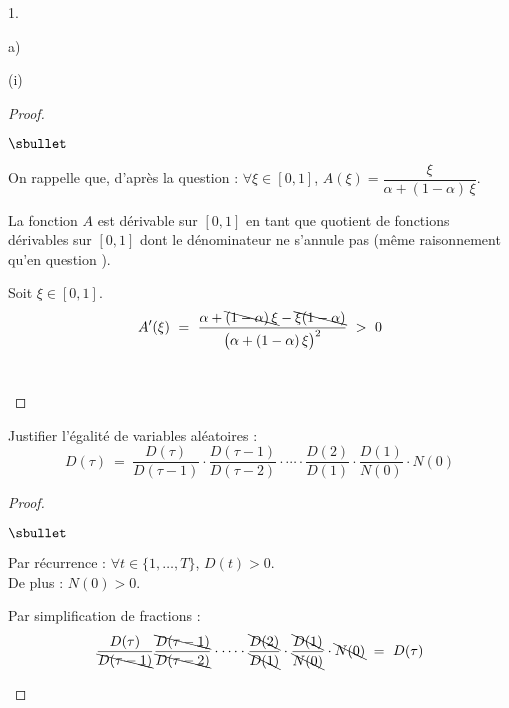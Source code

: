 \documentclass[11pt]{article}%
\begin{document}
\begin{noliste}{1.}
\begin{noliste}{a)}
\begin{nonoliste}{(i)}
      \begin{proof}~
        \begin{noliste}{$\sbullet$}
	  \item On rappelle que, d'après la question  :
	  $\forall \xi \in [0,1]$, $A(\xi) = \dfrac{\xi}{\alpha +
	  (1-\alpha) \, \xi}$.
	  
	  \item La fonction $A$ est dérivable sur $[0,1]$ en tant que 
	  quotient de fonctions dérivables sur $[0,1]$ dont le 
	  dénominateur ne s'annule pas (même raisonnement qu'en question 
	  ).
	  
	  \item Soit $\xi \in [0,1]$.
	  \[
	    A'(\xi) \ = \ \dfrac{\alpha + \bcancel{(1-\alpha) \, \xi}
	    - \bcancel{\xi(1-\alpha)}}{\big(\alpha + (1-\alpha) \,
	    \xi \big)^2} \ > \ 0
	  \]
	  ~\\[-1.4cm]
        \end{noliste}
      \end{proof}
    \end{nonoliste}
  \end{noliste}
    
  \item Justifier l'égalité de variables aléatoires :
  \[
    D(\tau) \ = \ \dfrac{D(\tau)}{D(\tau-1)} \cdot \dfrac{D(\tau-1)}
    {D(\tau-2)} \cdot \cdots \cdot \dfrac{D(2)}{D(1)} \cdot 
    \dfrac{D(1)}{N(0)} \cdot N(0)
  \]
  
  \begin{proof}~
    \begin{noliste}{$\sbullet$}
      \item Par récurrence : $\forall t \in \{1, \ldots, T\}$, 
      $D(t) >0$.\\
      De plus : $N(0)>0$.
      
      
      
      
      \item Par simplification de fractions :
      \[
	\dfrac{D(\tau)}{\bcancel{D(\tau-1)}}
        \dfrac{\bcancel{D(\tau-1)}}{\bcancel{D(\tau-2)}} 
        \cdot \cdots \cdot 
	\dfrac{\bcancel{D(2)}}{\bcancel{D(1)}}
	\cdot \dfrac{\bcancel{D(1)}}{\bcancel{N(0)}} 
	\cdot \bcancel{N(0)}
	\ = \ D(\tau)
      \]
    \end{noliste}
    

\end{proof}
\end{noliste}
\end{document}
